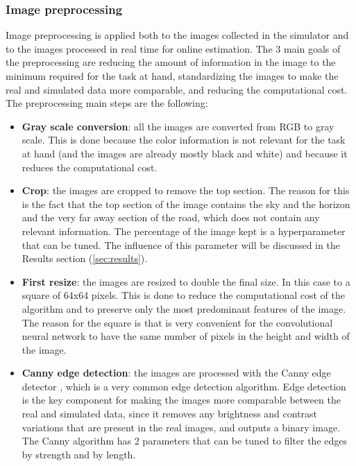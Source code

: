 \documentclass[a4paper,12pt,sort&compress]{article}
\begin{document}
    \subsubsection*{Image preprocessing}
    Image preprocessing is applied both to the images collected in the simulator and to the images
    processed in real time for online estimation. The 3 main goals of the preprocessing are reducing the 
    amount of information in the image to the minimum required for the task at hand, standardizing
    the images to make the real and simulated data more comparable, and reducing the computational 
    cost. The preprocessing main steps are the following:
    \begin{itemize}
        \item \textbf{Gray scale conversion}: all the images are converted from RGB to gray scale.
        This is done because the color information is not relevant for the task at hand (and the
        images are already mostly black and white) and because it reduces the computational cost.
        \item \textbf{Crop}: the images are cropped to remove the top section. The reason for this
        is the fact that the top section of the image contains the sky and the horizon and the very
        far away section of the road, which does not contain any relevant information. The
        percentage of the image kept is a hyperparameter that can be tuned. The influence of this
        parameter will be discussed in the Results section (\ref*{sec:results}).
        \item \textbf{First resize}: the images are resized to double the final size. In this case
        to a square of 64x64 pixels. This is done to reduce the computational cost of the algorithm
        and to preserve only the most predominant features of the image. The reason for the square
        is that is very convenient for the convolutional neural network to have the same number of 
        pixels in the height and width of the image.
        \item \textbf{Canny edge detection}: the images are processed with the Canny edge detector
        \citep*{canny}, which is a very common edge detection algorithm. Edge detection is the key
        component for making the images more comparable between the real and simulated data, since
        it removes any brightness and contrast variations that are present in the real images, and
        outputs a binary image. The Canny algorithm has 2 parameters that can be tuned to filter the
        edges by strength and by length.   

\end{itemize}
\end{document}
